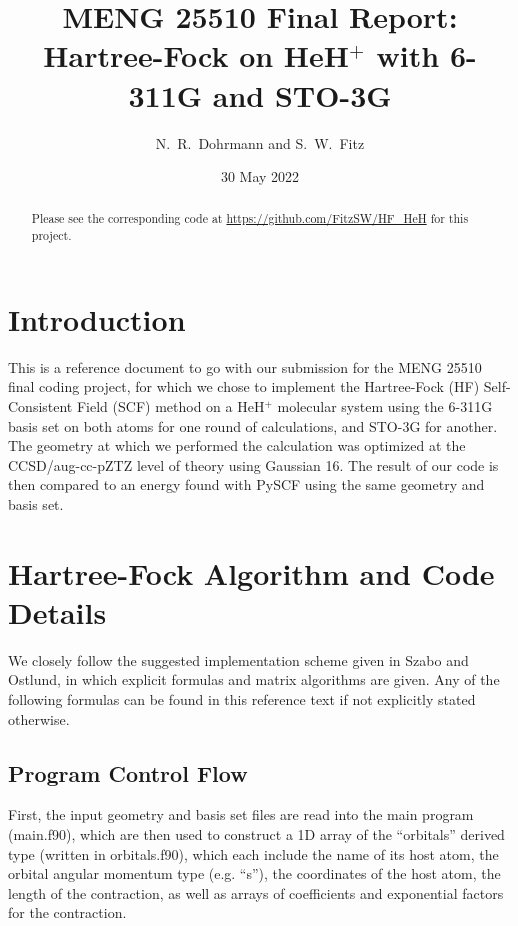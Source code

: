 \documentclass[%
 aip,
 amsmath,amssymb,
 reprint,%
]{revtex4-1}
\begin{document}

\title[MENG 25510 Final]{MENG 25510 Final Report:\\ Hartree-Fock on
HeH$^{+}$ with 6-311G and STO-3G}
\author{N.\ R.\ Dohrmann and S.\ W.\ Fitz}


\date{30 May 2022}%

\begin{abstract}
Please see the corresponding code at \url{https://github.com/FitzSW/HF_HeH}
for this project.
\end{abstract}

\maketitle

\section{Introduction}
This is a reference document to go with our submission for the MENG 25510
final coding project, for which we chose to implement the Hartree-Fock (HF)
Self-Consistent Field (SCF) method on a HeH$^{+}$ molecular system using the
6-311G basis set on both atoms for one round of calculations, and STO-3G for
another. The geometry at which we performed the
calculation was optimized at the CCSD/aug-cc-pZTZ level of theory using
Gaussian 16\cite{g16}. The result of our code is then compared to an energy
found with
PySCF\cite{sun2020recent,https://doi.org/10.1002/wcms.1340,https://doi.org/10.1002/jcc.23981}
using the same geometry and basis set.

\section{Hartree-Fock Algorithm and Code Details}
We closely follow the suggested implementation scheme given in Szabo and
Ostlund\cite{szabo2012modern}, in which explicit formulas and matrix
algorithms are given. Any of the following formulas can be found in this
reference text if not explicitly stated otherwise.

\subsection{Program Control Flow} 
First, the input geometry and basis set files are read into the main program
({\code main.f90}), which are then used to construct a 1D array of the
``orbitals'' derived type (written in {\code orbitals.f90}), which each include
the name of its host atom, the orbital angular momentum type (e.g. ``s''), the
coordinates of the host atom, the length of the contraction, as well as arrays
of coefficients and exponential factors for the contraction.
\end{document}

